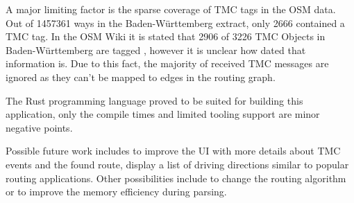 \documentclass[a4paper]{scrartcl}
\begin{document}
A major limiting factor is the sparse coverage of TMC tags in the OSM data. Out of 1457361 ways in the Baden-Württemberg extract, only 2666 contained a TMC tag. In the OSM Wiki it is stated that 2906 of 3226 TMC Objects in Baden-Württemberg are tagged \cite{osm_wiki_tmc}, however it is unclear how dated that information is. Due to this fact, the majority of received TMC messages are ignored as they can't be mapped to edges in the routing graph. 

The Rust programming language proved to be suited for building this application, only the compile times and limited tooling support are minor negative points.

Possible future work includes to improve the UI with more details about TMC events and the found route, display a list of driving directions similar to popular routing applications. Other possibilities include to change the routing algorithm or to improve the memory efficiency during parsing.

\printbibliography
\end{document}
